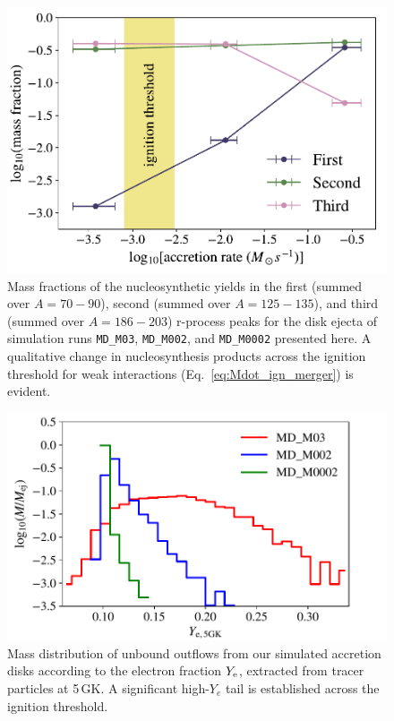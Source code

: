 \begin{figure}[t]
  \includegraphics[width=\columnwidth]{figures/kilonova/mass_fraction_peaks.pdf}
 \caption{Mass fractions of the nucleosynthetic yields in
the first (summed over $A=70-90$), second (summed over $A=125-135$), and third (summed over $A=186-203$) r-process peaks for the disk ejecta of simulation runs \texttt{MD\_M03}, \texttt{MD\_M002}, and \texttt{MD\_M0002} presented here. A qualitative change in nucleosynthesis products across the ignition threshold for weak interactions (Eq.~\eqref{eq:Mdot_ign_merger}) is evident. \label{fig:mass_frac_peaks}}
\end{figure}

\begin{figure}[t]
  \includegraphics[width=\columnwidth]{figures/kilonova/Ye_sims_comparison_MD_M03-MD_M002-MD_M0002.pdf}
 \caption{Mass distribution of unbound outflows from our simulated accretion disks according to the electron fraction $Y_{\rm e}$, extracted from tracer particles at 5\,GK. A significant high-$Y_e$ tail is established across the ignition threshold. \label{fig:mass-Ye-outflow}}
\end{figure}

